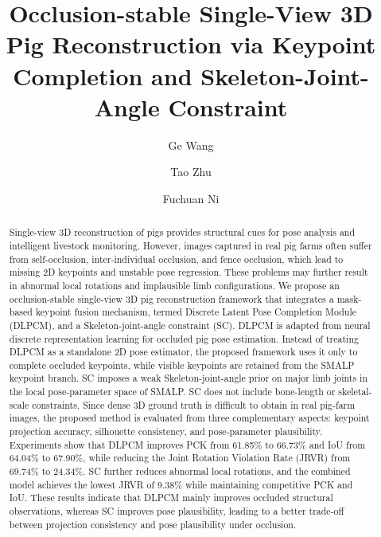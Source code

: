 \documentclass[runningheads]{llncs}
\begin{document}
%
\title{Occlusion-stable Single-View 3D Pig Reconstruction via Keypoint Completion and Skeleton-Joint-Angle Constraint}
%
%
\author{Ge Wang \and
Tao Zhu \and
Fuchuan Ni}
%
%
%
\maketitle              %
%
\begin{abstract}
Single-view 3D reconstruction of pigs provides structural cues for pose analysis and intelligent livestock monitoring. However, images captured in real pig farms often suffer from self-occlusion, inter-individual occlusion, and fence occlusion, which lead to missing 2D keypoints and unstable pose regression. These problems may further result in abnormal local rotations and implausible limb configurations. We propose an occlusion-stable single-view 3D pig reconstruction framework that integrates a mask-based keypoint fusion mechanism, termed Discrete Latent Pose Completion Module (DLPCM), and a Skeleton-joint-angle constraint (SC). DLPCM is adapted from neural discrete representation learning for occluded pig pose estimation. Instead of treating DLPCM as a standalone 2D pose estimator, the proposed framework uses it only to complete occluded keypoints, while visible keypoints are retained from the SMALP keypoint branch. SC imposes a weak Skeleton-joint-angle prior on major limb joints in the local pose-parameter space of SMALP. SC does not include bone-length or skeletal-scale constraints. Since dense 3D ground truth is difficult to obtain in real pig-farm images, the proposed method is evaluated from three complementary aspects: keypoint projection accuracy, silhouette consistency, and pose-parameter plausibility. Experiments show that DLPCM improves PCK from 61.85\% to 66.73\% and IoU from 64.04\% to 67.90\%, while reducing the Joint Rotation Violation Rate (JRVR) from 69.74\% to 24.34\%. SC further reduces abnormal local rotations, and the combined model achieves the lowest JRVR of 9.38\% while maintaining competitive PCK and IoU. These results indicate that DLPCM mainly improves occluded structural observations, whereas SC improves pose plausibility, leading to a better trade-off between projection consistency and pose plausibility under occlusion.

\end{abstract}
%
%
\end{document}
